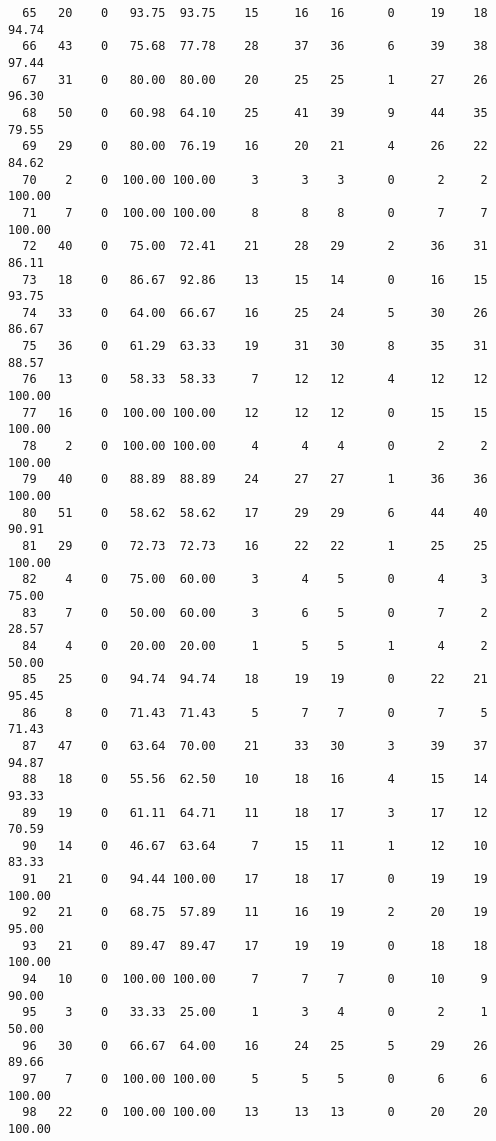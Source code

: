 \begin{verbatim}
  65   20    0   93.75  93.75    15     16   16      0     19    18    94.74
  66   43    0   75.68  77.78    28     37   36      6     39    38    97.44
  67   31    0   80.00  80.00    20     25   25      1     27    26    96.30
  68   50    0   60.98  64.10    25     41   39      9     44    35    79.55
  69   29    0   80.00  76.19    16     20   21      4     26    22    84.62
  70    2    0  100.00 100.00     3      3    3      0      2     2   100.00
  71    7    0  100.00 100.00     8      8    8      0      7     7   100.00
  72   40    0   75.00  72.41    21     28   29      2     36    31    86.11
  73   18    0   86.67  92.86    13     15   14      0     16    15    93.75
  74   33    0   64.00  66.67    16     25   24      5     30    26    86.67
  75   36    0   61.29  63.33    19     31   30      8     35    31    88.57
  76   13    0   58.33  58.33     7     12   12      4     12    12   100.00
  77   16    0  100.00 100.00    12     12   12      0     15    15   100.00
  78    2    0  100.00 100.00     4      4    4      0      2     2   100.00
  79   40    0   88.89  88.89    24     27   27      1     36    36   100.00
  80   51    0   58.62  58.62    17     29   29      6     44    40    90.91
  81   29    0   72.73  72.73    16     22   22      1     25    25   100.00
  82    4    0   75.00  60.00     3      4    5      0      4     3    75.00
  83    7    0   50.00  60.00     3      6    5      0      7     2    28.57
  84    4    0   20.00  20.00     1      5    5      1      4     2    50.00
  85   25    0   94.74  94.74    18     19   19      0     22    21    95.45
  86    8    0   71.43  71.43     5      7    7      0      7     5    71.43
  87   47    0   63.64  70.00    21     33   30      3     39    37    94.87
  88   18    0   55.56  62.50    10     18   16      4     15    14    93.33
  89   19    0   61.11  64.71    11     18   17      3     17    12    70.59
  90   14    0   46.67  63.64     7     15   11      1     12    10    83.33
  91   21    0   94.44 100.00    17     18   17      0     19    19   100.00
  92   21    0   68.75  57.89    11     16   19      2     20    19    95.00
  93   21    0   89.47  89.47    17     19   19      0     18    18   100.00
  94   10    0  100.00 100.00     7      7    7      0     10     9    90.00
  95    3    0   33.33  25.00     1      3    4      0      2     1    50.00
  96   30    0   66.67  64.00    16     24   25      5     29    26    89.66
  97    7    0  100.00 100.00     5      5    5      0      6     6   100.00
  98   22    0  100.00 100.00    13     13   13      0     20    20   100.00

\end{verbatim}
